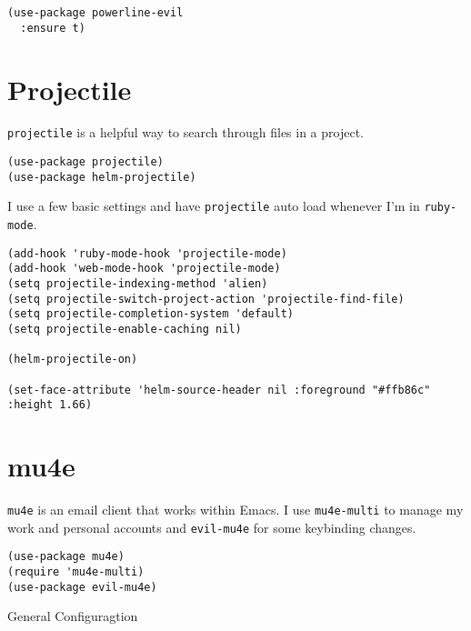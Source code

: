 \documentclass{article}
\begin{document}
\begin{verbatim}
(use-package powerline-evil
  :ensure t)
\end{verbatim}

\section{Projectile}
\label{sec-12}

\texttt{projectile} is a helpful way to search through files in a project.

\begin{verbatim}
(use-package projectile)
(use-package helm-projectile)
\end{verbatim}

I use a few basic settings and have \texttt{projectile} auto load whenever I'm in \texttt{ruby-mode}.

\begin{verbatim}
(add-hook 'ruby-mode-hook 'projectile-mode)
(add-hook 'web-mode-hook 'projectile-mode)
(setq projectile-indexing-method 'alien)
(setq projectile-switch-project-action 'projectile-find-file)
(setq projectile-completion-system 'default)
(setq projectile-enable-caching nil)

(helm-projectile-on)

(set-face-attribute 'helm-source-header nil :foreground "#ffb86c" :height 1.66)
\end{verbatim}

\section{mu4e}
\label{sec-13}

\texttt{mu4e} is an email client that works within Emacs. I use \texttt{mu4e-multi} to manage my work and personal accounts and \texttt{evil-mu4e} for some keybinding changes.

\begin{verbatim}
(use-package mu4e)
(require 'mu4e-multi)
(use-package evil-mu4e)
\end{verbatim}

General Configuragtion
\end{document}
